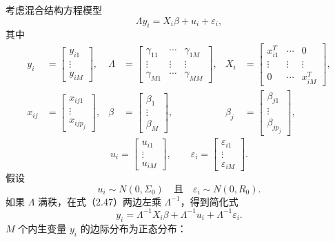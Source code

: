 考虑混合结构方程模型
\begin{equation}
\Lambda y_i=X_i\beta+u_i+\varepsilon_i,
\tag{2.47}
\end{equation}
其中
\[
\begin{aligned}
y_i&=\begin{bmatrix}y_{i1}\\\vdots\\y_{iM}\end{bmatrix},
&\Lambda&=\begin{bmatrix}\gamma_{11}&\cdots&\gamma_{1M}\\
\vdots&\vdots&\vdots\\\gamma_{M1}&\cdots&\gamma_{MM}\end{bmatrix},
&X_i&=\begin{bmatrix}x_{i1}^T&\cdots&0\\
\vdots&\vdots&\vdots\\0&\cdots&x_{iM}^T\end{bmatrix},\\
x_{ij}&=\begin{bmatrix}x_{ij1}\\\vdots\\x_{ijp_j}\end{bmatrix},
&\beta&=\begin{bmatrix}\beta_1\\\vdots\\\beta_M\end{bmatrix},
&\beta_j&=\begin{bmatrix}\beta_{j1}\\\vdots\\\beta_{jp_j}\end{bmatrix},
\end{aligned}
\]
\[
u_i=\begin{bmatrix}u_{i1}\\\vdots\\u_{iM}\end{bmatrix},
\qquad
\varepsilon_i=\begin{bmatrix}\varepsilon_{i1}\\\vdots\\\varepsilon_{iM}\end{bmatrix}.
\]
假设
\[
u_i\sim N(0,\Sigma_0)\quad\text{且}\quad\varepsilon_i\sim N(0,R_0).
\]
如果 $\Lambda$ 满秩，在式（2.47）两边左乘 $\Lambda^{-1}$，得到简化式
\begin{equation}
y_i=\Lambda^{-1}X_i\beta+\Lambda^{-1}u_i+\Lambda^{-1}\varepsilon_i.
\tag{2.48}
\end{equation}
$M$ 个内生变量 $y_i$ 的边际分布为正态分布：

